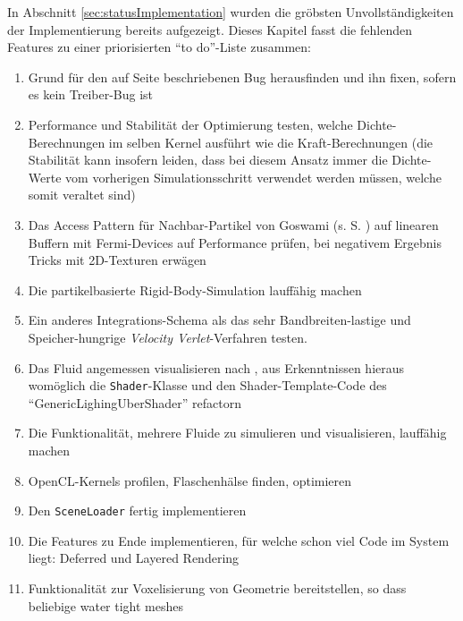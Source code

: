   	In Abschnitt \ref{sec:statusImplementation} wurden die gröbsten Unvollständigkeiten der Implementierung
	bereits aufgezeigt. Dieses Kapitel fasst die fehlenden Features zu einer priorisierten
	"`to do"'-Liste zusammen:\\
	\begin{enumerate}
		\item Grund für den auf Seite \pageref{enum:oclSyncBug} beschriebenen Bug herausfinden und ihn fixen,
		sofern es kein Treiber-Bug ist
		\item Performance und Stabilität der Optimierung testen, welche Dichte-Berechnungen im selben
		Kernel ausführt wie die Kraft-Berechnungen (die Stabilität kann insofern leiden, dass bei diesem Ansatz
		immer die Dichte-Werte vom vorherigen Simulationsschritt verwendet werden müssen, welche somit veraltet sind)
		\item Das Access Pattern für Nachbar-Partikel von Goswami (s. S. \pageref{enum:goswamiAccessPattern})
			 auf linearen Buffern mit Fermi-Devices auf Performance prüfen, bei negativem Ergebnis Tricks mit 2D-Texturen
			 erwägen
		\item Die partikelbasierte Rigid-Body-Simulation lauffähig machen
		\item Ein anderes Integrations-Schema als das sehr Bandbreiten-lastige und Speicher-hungrige 
			\emph{Velocity Verlet}-Verfahren testen.
		\item Das Fluid angemessen visualisieren nach \cite{Green2009FluidRenderingCurvatureFlow}, aus Erkenntnissen
		hieraus womöglich die \lstinline|Shader|-Klasse und den Shader-Template-Code des
		"`GenericLighingUberShader"' refactorn
		\item Die Funktionalität, mehrere Fluide zu simulieren und visualisieren, lauffähig machen
		\item OpenCL-Kernels profilen, Flaschenhälse finden, optimieren
		\item Den \lstinline|SceneLoader| fertig implementieren
		\item Die Features zu Ende implementieren, für welche schon viel Code im System liegt: 
		Deferred und Layered Rendering
		\item Funktionalität zur Voxelisierung von Geometrie bereitstellen, so dass beliebige water tight meshes

\end{enumerate}
